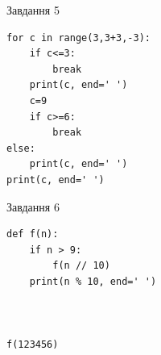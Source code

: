 \documentclass[12pt, ukrainian]{article}
\begin{document}
{\vspace{15mm}
\begin{minipage}[t]{9.7cm}                
{\begin{center}Завдання {5}\end{center}}
\begin{verbatim}
for c in range(3,3+3,-3):
    if c<=3:
        break
    print(c, end=' ')
    c=9
    if c>=6:
        break
else:
    print(c, end=' ')
print(c, end=' ')
\end{verbatim}     
\end{minipage}
\vline \hspace{8mm}
\begin{minipage}[t]{8.0cm}                
{\begin{center}Завдання {6}\end{center}}
\begin{verbatim}
def f(n):
    if n > 9:
        f(n // 10)
    print(n % 10, end=' ')
    


f(123456)
\end{verbatim}     
\end{minipage}

}
\newpage
\end{document}
